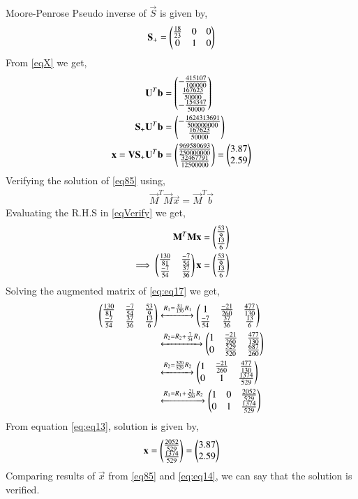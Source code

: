 \documentclass[journal,12pt,twocolumn]{IEEEtran}
\begin{document}
Moore-Penrose Pseudo inverse of $\vec{S}$ is given by,
\begin{align}
\mathbf{S_+} = \begin{pmatrix}\frac{18}{23}&0&0\\0&1&0\end{pmatrix}
\end{align}
From \eqref{eqX} we get,
\begin{align}
\mathbf{U}^T\mathbf{b}&=\begin{pmatrix}-\frac{415107}{100000}\\\frac{167623}{50000}\\-\frac{154347}{50000}\end{pmatrix}\\
\mathbf{S_+}\mathbf{U}^T\mathbf{b}&=\begin{pmatrix}-\frac{1624313691}{500000000}\\\frac{167623}{50000}\end{pmatrix}\\
\mathbf{x} = \mathbf{V}\mathbf{S_+}\mathbf{U}^T\mathbf{b} &= \begin{pmatrix}\frac{969580693}{250000000}\\\frac{32467791}{12500000}\end{pmatrix}=\begin{pmatrix}3.87\\2.59\end{pmatrix}\label{eq85}
\end{align}
Verifying the solution of \eqref{eq85} using,
\begin{align}
\vec{M}^T\vec{M}\vec{x} = \vec{M}^T\vec{b}\label{eqVerify}
\end{align}
Evaluating the R.H.S in \eqref{eqVerify} we get,
\begin{align}
\mathbf{M}^T\mathbf{M}\mathbf{x} &= \begin{pmatrix}\frac{53}{9}\\\frac{13}{6}\end{pmatrix}\\
\implies\begin{pmatrix}\frac{130}{81}&\frac{-7}{54}\\\frac{-7}{54}&\frac{37}{36}\end{pmatrix}\mathbf{x} &= \begin{pmatrix}\frac{53}{9}\\\frac{13}{6}\end{pmatrix}\label{eq:eq17}
\end{align}
Solving the augmented matrix of \eqref{eq:eq17} we get,
\begin{align}
\begin{pmatrix}\frac{130}{81}&\frac{-7}{54}&\frac{53}{9}\\\frac{-7}{54}&\frac{37}{36}&\frac{13}{6}\end{pmatrix} &\xleftrightarrow{R_1=\frac{81}{130}R_1}\begin{pmatrix}1&\frac{-21}{260}&\frac{477}{130}\\\frac{-7}{54}&\frac{37}{36}&\frac{13}{6}\end{pmatrix}\\
&\xleftrightarrow{R_2=R_2+\frac{7}{54}R_1}\begin{pmatrix}1&\frac{-21}{260}&\frac{477}{130}\\0&\frac{529}{520}&\frac{687}{260}\end{pmatrix}\\
&\xleftrightarrow{R_2=\frac{520}{529}R_2}\begin{pmatrix}1&\frac{-21}{260}&\frac{477}{130}\\0&1&\frac{1374}{529}\end{pmatrix}\\
&\xleftrightarrow{R_1=R_1+\frac{21}{260}R_2}\begin{pmatrix}1&0&\frac{2052}{529}\\0&1&\frac{1374}{529}\end{pmatrix}\label{eq:eq13}
\end{align}
From equation \eqref{eq:eq13}, solution is given by,
\begin{align}\label{eq:eq14}
\mathbf{x}=\begin{pmatrix}\frac{2052}{529}\\\frac{1374}{529}\end{pmatrix}=\begin{pmatrix}3.87\\2.59\end{pmatrix}
\end{align}
Comparing results of $\vec{x}$ from \eqref{eq85} and \eqref{eq:eq14}, we can say that the solution is verified.
\end{document}
